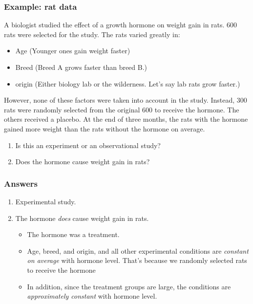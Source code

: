 \documentclass[handout]{beamer}
\numberwithin{equation}{section}
\begin{document}
\begin{frame}
\frametitle{Example: rat data}
\small
A biologist studied the effect of a growth hormone on weight gain in rats. 600 rats were selected for the study. The rats varied greatly in:
\begin{itemize}
\pause \item Age (Younger ones gain weight faster)
\pause \item Breed (Breed A grows faster than breed B.)
\pause \item origin (Either biology lab or the wilderness. Let's say lab rats grow faster.)
\end{itemize}
\pause However, none of these factors were taken into account in the study. Instead, 300 rats were randomly selected from the original 600 to receive the hormone. The others received a placebo. \pause At the end of three months, the rats with the hormone gained more weight than the rats without the hormone on average.

\begin{enumerate}[1. ]
\pause \item Is this an experiment or an observational study?
\pause \item Does the hormone cause weight gain in rats?
\end{enumerate}
\end{frame}


\begin{frame}
\frametitle{Answers}
\begin{enumerate}[1. ]
\pause \item Experimental study.
\pause \item The hormone \emph{does} cause weight gain in rats.
\begin{itemize}
\pause \item The hormone was a treatment.
\pause \item Age, breed, and origin, and all other experimental conditions are \emph{constant on average} with hormone level. That's because we randomly selected rats to receive the hormone
\pause \item In addition, since the treatment groups are large, the conditions are \emph{approximately constant} with hormone level.
\end{itemize}
\end{enumerate}
\end{frame}

\end{document}
